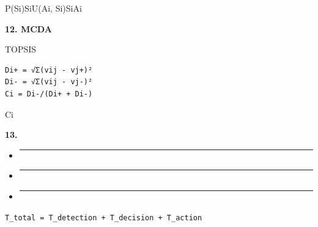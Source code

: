 P(Si)SiU(Ai, Si)SiAi

\textbf{12. MCDA}

TOPSIS

\begin{verbatim}
Di+ = √Σ(vij - vj+)²
Di- = √Σ(vij - vj-)²
Ci = Di-/(Di+ + Di-)
\end{verbatim}

Ci

\textbf{13. }

\begin{itemize}
\item
  \begin{center}\rule{0.5\linewidth}{0.5pt}\end{center}
\item
  \begin{center}\rule{0.5\linewidth}{0.5pt}\end{center}
\item
  \begin{center}\rule{0.5\linewidth}{0.5pt}\end{center}
\end{itemize}

\texttt{T\_total\ =\ T\_detection\ +\ T\_decision\ +\ T\_action}

\subsubsection{}\label{section-54}

